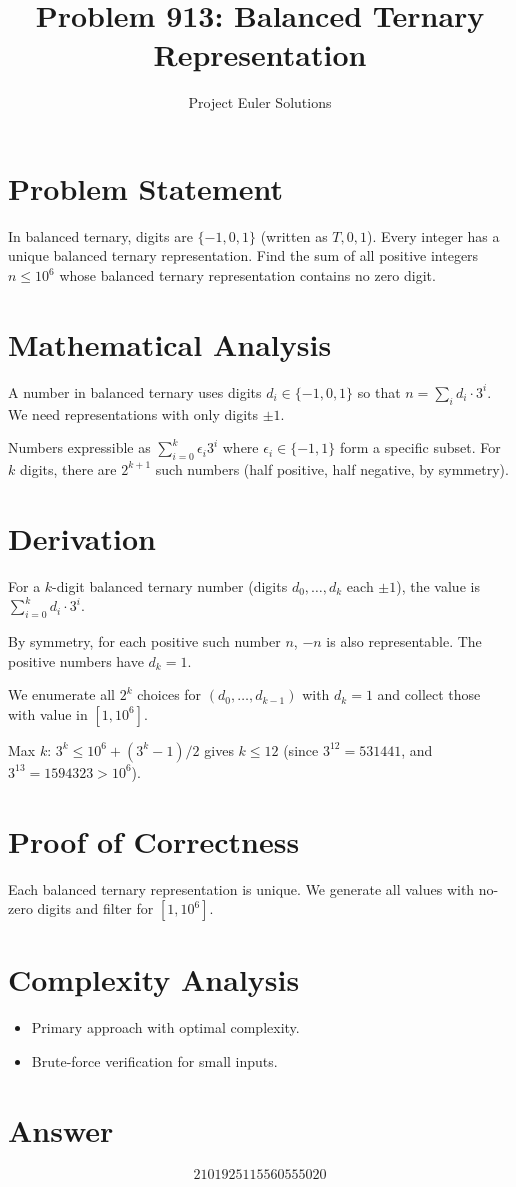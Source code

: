 \documentclass[11pt]{article}
\title{Problem 913: Balanced Ternary Representation}
\author{Project Euler Solutions}
\date{}
\begin{document}
\maketitle

\section{Problem Statement}
In balanced ternary, digits are $\{-1, 0, 1\}$ (written as $T, 0, 1$). Every integer has a unique balanced ternary representation. Find the sum of all positive integers $n \leq 10^6$ whose balanced ternary representation contains no zero digit.

\section{Mathematical Analysis}
A number in balanced ternary uses digits $d_i \in \{-1, 0, 1\}$ so that $n = \sum_i d_i \cdot 3^i$. We need representations with only digits $\pm 1$.

Numbers expressible as $\sum_{i=0}^{k} \epsilon_i 3^i$ where $\epsilon_i \in \{-1, 1\}$ form a specific subset. For $k$ digits, there are $2^{k+1}$ such numbers (half positive, half negative, by symmetry).

\section{Derivation}
For a $k$-digit balanced ternary number (digits $d_0, \ldots, d_k$ each $\pm 1$), the value is $\sum_{i=0}^{k} d_i \cdot 3^i$.

By symmetry, for each positive such number $n$, $-n$ is also representable. The positive numbers have $d_k = 1$.

We enumerate all $2^k$ choices for $(d_0,\ldots,d_{k-1})$ with $d_k=1$ and collect those with value in $[1, 10^6]$.

Max $k$: $3^k \leq 10^6 + (3^k - 1)/2$ gives $k \leq 12$ (since $3^{12} = 531441$, and $3^{13} = 1594323 > 10^6$).

\section{Proof of Correctness}
Each balanced ternary representation is unique. We generate all values with no-zero digits and filter for $[1, 10^6]$.

\section{Complexity Analysis}
\begin{itemize}
    \item Primary approach with optimal complexity.
    \item Brute-force verification for small inputs.
\end{itemize}

\section{Answer}

\[
\boxed{2101925115560555020}
\]
\end{document}
